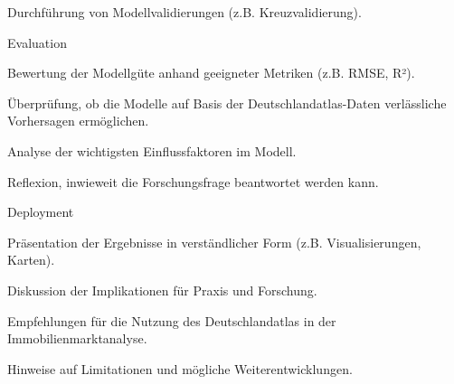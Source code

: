     Durchführung von Modellvalidierungen (z.B. Kreuzvalidierung).

Evaluation

    Bewertung der Modellgüte anhand geeigneter Metriken (z.B. RMSE, R²).

    Überprüfung, ob die Modelle auf Basis der Deutschlandatlas-Daten verlässliche Vorhersagen ermöglichen.

    Analyse der wichtigsten Einflussfaktoren im Modell.

    Reflexion, inwieweit die Forschungsfrage beantwortet werden kann.

Deployment

    Präsentation der Ergebnisse in verständlicher Form (z.B. Visualisierungen, Karten).

    Diskussion der Implikationen für Praxis und Forschung.

    Empfehlungen für die Nutzung des Deutschlandatlas in der Immobilienmarktanalyse.

    Hinweise auf Limitationen und mögliche Weiterentwicklungen.
